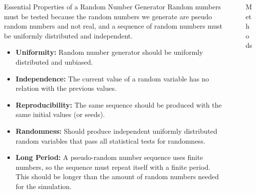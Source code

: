 \documentclass[final]{beamer}
\newlength{\sepwidth}
\newlength{\colwidth}
\newcommand{\separatorcolumn}{\begin{column}{\sepwidth}\end{column}}
\begin{document}
\begin{frame}[t]
\begin{columns}[t]
\begin{column}{\colwidth}
  \begin{block}{Essential Properties of a Random Number Generator}
  Random numbers must be tested because the random numbers we generate are pseudo random numbers and not real, and a sequence of random numbers must be uniformly distributed and independent.
    \begin{itemize}
      \item \textbf{Uniformity:} Random number generator should be uniformly distributed and unbiased.
      \item \textbf{Independence:} The current value of a random variable has no relation with the previous values.
      \item \textbf{Reproducibility:} The same sequence should be produced with the same initial values (or seeds).
      \item \textbf{Randomness:} Should produce independent uniformly distributed random variables that pass all statistical tests for randomness.
      \item \textbf{Long Period:} A pseudo-random number sequence uses finite numbers, so the sequence must repeat itself with a finite period. This should be longer than the amount of random numbers needed for the simulation.
      
    \end{itemize}

  \end{block}

\end{column}

\separatorcolumn

\begin{column}{\colwidth}

  \begin{alertblock}{Methods}
  \begin{itemize}


\end{itemize}
\end{alertblock}
\end{column}
\end{columns}
\end{frame}
\end{document}

